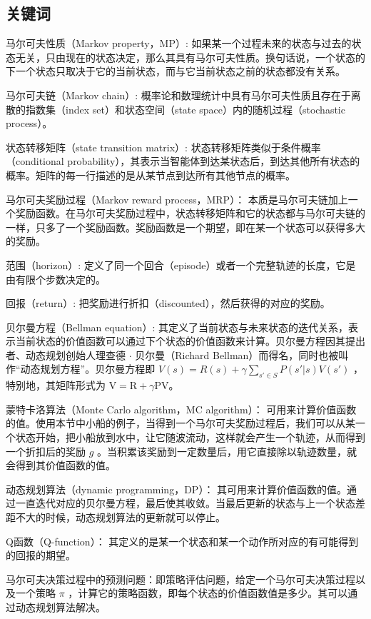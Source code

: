 \subsection{关键词}

马尔可夫性质（Markov property，MP）: 如果某一个过程未来的状态与过去的状态无关，只由现在的状态决定，那么其具有马尔可夫性质。换句话说，一个状态的下一个状态只取决于它的当前状态，而与它当前状态之前的状态都没有关系。

马尔可夫链（Markov chain）: 概率论和数理统计中具有马尔可夫性质且存在于离散的指数集（index set）和状态空间（state space）内的随机过程（stochastic process）。

状态转移矩阵（state transition matrix）: 状态转移矩阵类似于条件概率（conditional probability），其表示当智能体到达某状态后，到达其他所有状态的概率。矩阵的每一行描述的是从某节点到达所有其他节点的概率。

马尔可夫奖励过程（Markov reward process，MRP）： 本质是马尔可夫链加上一个奖励函数。在马尔可夫奖励过程中，状态转移矩阵和它的状态都与马尔可夫链的一样，只多了一个奖励函数。奖励函数是一个期望，即在某一个状态可以获得多大的奖励。

范围（horizon）: 定义了同一个回合（episode）或者一个完整轨迹的长度，它是由有限个步数决定的。

回报（return）: 把奖励进行折扣（discounted），然后获得的对应的奖励。

贝尔曼方程（Bellman equation）: 其定义了当前状态与未来状态的迭代关系，表示当前状态的价值函数可以通过下个状态的价值函数来计算。贝尔曼方程因其提出者、动态规划创始人理查德 $\cdot$ 贝尔曼（Richard Bellman）而得名，同时也被叫作“动态规划方程”。贝尔曼方程即 $V(s)=R(s)+ \gamma \sum_{s' \in S}P(s'|s)V(s')$ ，特别地，其矩阵形式为 $\mathrm{V}=\mathrm{R}+\gamma \mathrm{PV}$。

蒙特卡洛算法（Monte Carlo algorithm，MC algorithm）： 可用来计算价值函数的值。使用本节中小船的例子，当得到一个马尔可夫奖励过程后，我们可以从某一个状态开始，把小船放到水中，让它随波流动，这样就会产生一个轨迹，从而得到一个折扣后的奖励 $g$ 。当积累该奖励到一定数量后，用它直接除以轨迹数量，就会得到其价值函数的值。

动态规划算法（dynamic programming，DP）： 其可用来计算价值函数的值。通过一直迭代对应的贝尔曼方程，最后使其收敛。当最后更新的状态与上一个状态差距不大的时候，动态规划算法的更新就可以停止。

Q函数（Q-function）： 其定义的是某一个状态和某一个动作所对应的有可能得到的回报的期望。

马尔可夫决策过程中的预测问题：即策略评估问题，给定一个马尔可夫决策过程以及一个策略 $\pi$ ，计算它的策略函数，即每个状态的价值函数值是多少。其可以通过动态规划算法解决。

